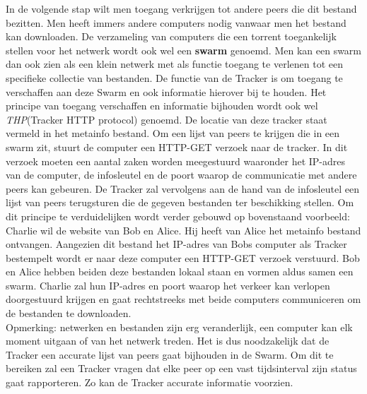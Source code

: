 In de volgende stap wilt men toegang verkrijgen tot andere peers die dit bestand bezitten. Men heeft immers andere computers nodig vanwaar men het bestand kan downloaden. De verzameling van computers die een torrent toegankelijk stellen voor het netwerk wordt ook wel een \textbf{swarm} genoemd. Men kan een swarm dan ook zien als een klein netwerk met als functie toegang te verlenen tot een specifieke collectie van bestanden. De functie van de Tracker is om toegang te verschaffen aan deze Swarm en ook informatie hierover bij te houden. Het principe van toegang verschaffen en informatie bijhouden wordt ook wel \textit{THP}(Tracker HTTP protocol) genoemd. De locatie van deze tracker staat vermeld in het metainfo bestand. Om een lijst van peers te krijgen die in een swarm zit, stuurt de computer een HTTP-GET verzoek naar de tracker. In dit verzoek moeten een aantal zaken worden meegestuurd waaronder het IP-adres van de computer, de infosleutel en de poort waarop de communicatie met andere peers kan gebeuren. De Tracker zal vervolgens aan de hand van de infosleutel een lijst van peers terugsturen die de gegeven bestanden ter beschikking stellen. Om dit principe te verduidelijken wordt verder gebouwd op bovenstaand voorbeeld:\\

Charlie wil de website van Bob en Alice. Hij heeft van Alice het metainfo bestand ontvangen. Aangezien dit bestand het IP-adres van Bobs computer als Tracker bestempelt wordt er naar deze computer een HTTP-GET verzoek verstuurd. Bob en Alice hebben beiden deze bestanden lokaal staan en vormen aldus samen een swarm. Charlie zal hun IP-adres en poort waarop het verkeer kan verlopen doorgestuurd krijgen en gaat rechtstreeks met beide computers communiceren om de bestanden te downloaden.\\

Opmerking: netwerken en bestanden zijn erg veranderlijk, een computer kan elk moment uitgaan of van het netwerk treden. Het is dus noodzakelijk dat de Tracker een accurate lijst van peers gaat bijhouden in de Swarm. Om dit te bereiken zal een Tracker vragen dat elke peer op een vast tijdsinterval zijn status gaat rapporteren. Zo kan de Tracker accurate informatie voorzien.\\

